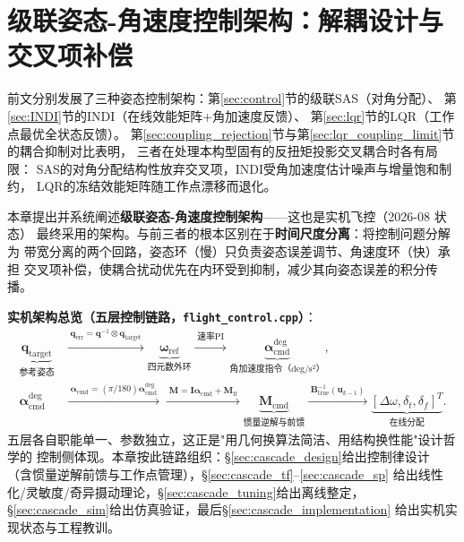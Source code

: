 
\section{级联姿态-角速度控制架构：解耦设计与交叉项补偿}
\label{sec:cascade_chapter}

前文分别发展了三种姿态控制架构：第\ref{sec:control}节的级联SAS（对角分配）、
第\ref{sec:INDI}节的INDI（在线效能矩阵+角加速度反馈）、
第\ref{sec:lqr}节的LQR（工作点最优全状态反馈）。
第\ref{sec:coupling_rejection}节与第\ref{sec:lqr_coupling_limit}节的耦合抑制对比表明，
三者在处理本构型固有的反扭矩投影交叉耦合时各有局限：
SAS的对角分配结构性放弃交叉项，INDI受角加速度估计噪声与增量饱和制约，
LQR的冻结效能矩阵随工作点漂移而退化。

本章提出并系统阐述\textbf{级联姿态-角速度控制架构}——这也是实机飞控（2026-08 状态）
最终采用的架构。与前三者的根本区别在于\textbf{时间尺度分离}：将控制问题分解为
带宽分离的两个回路，姿态环（慢）只负责姿态误差调节、角速度环（快）承担
交叉项补偿，使耦合扰动优先在内环受到抑制，减少其向姿态误差的积分传播。

\textbf{实机架构总览（五层控制链路，\texttt{flight\_control.cpp}）}：
\begin{equation}
\begin{aligned}
    \underbrace{\mathbf q_{\mathrm{target}}}_{\text{参考姿态}}
    &\xrightarrow{\;\mathbf q_{\mathrm{err}}=\mathbf q^{-1}\otimes\mathbf q_{\mathrm{target}}\;}
    \underbrace{\boldsymbol\omega_{\mathrm{ref}}}_{\text{四元数外环}}
    \xrightarrow{\;\text{速率PI}\;}
    \underbrace{\boldsymbol\alpha_{\mathrm{cmd}}^{\deg}}_{\text{角加速度指令（deg/s$^2$）}},\\
    \boldsymbol\alpha_{\mathrm{cmd}}^{\deg}
    &\xrightarrow{\;\boldsymbol\alpha_{\mathrm{cmd}}=(\pi/180)\boldsymbol\alpha_{\mathrm{cmd}}^{\deg}\;}
    \xrightarrow{\;\mathbf M=\mathbf I\boldsymbol\alpha_{\mathrm{cmd}}+\mathbf M_{\mathrm{ff}}\;}
    \underbrace{\mathbf M_{\mathrm{cmd}}}_{\text{惯量逆解与前馈}}
    \xrightarrow{\;\mathbf B_{\mathrm{true}}^{-1}(\mathbf u_{k-1})\;}
    \underbrace{[\Delta\omega,\delta_t,\delta_f]^T}_{\text{在线分配}} .
\end{aligned}
    \label{eq:cascade_chain}
\end{equation}
五层各自职能单一、参数独立，这正是"用几何换算法简洁、用结构换性能"设计哲学的
控制侧体现。本章按此链路组织：§\ref{sec:cascade_design}给出控制律设计
（含惯量逆解前馈与工作点管理），§\ref{sec:cascade_tf}--\ref{sec:cascade_sp}
给出线性化/灵敏度/奇异摄动理论，§\ref{sec:cascade_tuning}给出离线整定，
§\ref{sec:cascade_sim}给出仿真验证，最后§\ref{sec:cascade_implementation}
给出实机实现状态与工程教训。

